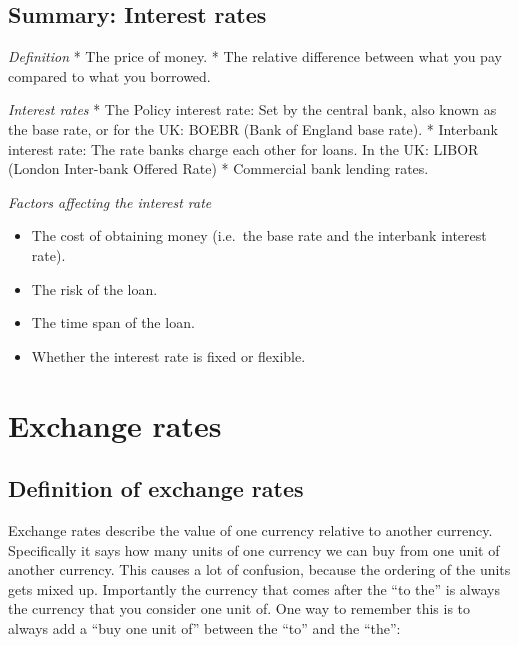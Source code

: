 \documentclass[
]{book}
\providecommand{\tightlist}{%
  \setlength{\itemsep}{0pt}\setlength{\parskip}{0pt}}
\begin{document}
\hypertarget{summary-interest-rates}{%
\subsection{Summary: Interest rates}\label{summary-interest-rates}}

\emph{Definition}
* The price of money.
* The relative difference between what you pay compared to what you borrowed.

\emph{Interest rates}
* The Policy interest rate: Set by the central bank, also known as the base rate, or for the UK: BOEBR (Bank of England base rate).
* Interbank interest rate: The rate banks charge each other for loans. In the UK: LIBOR (London Inter-bank Offered Rate)
* Commercial bank lending rates.

\emph{Factors affecting the interest rate}

\begin{itemize}
\tightlist
\item
  The cost of obtaining money (i.e.~the base rate and the interbank interest rate).
\item
  The risk of the loan.
\item
  The time span of the loan.
\item
  Whether the interest rate is fixed or flexible.
\end{itemize}

\hypertarget{exchange-rates}{%
\section{Exchange rates}\label{exchange-rates}}

\hypertarget{definition-of-exchange-rates}{%
\subsection*{Definition of exchange rates}\label{definition-of-exchange-rates}}

Exchange rates describe the value of one currency relative to another currency. Specifically it says how many units of one currency we can buy from one unit of another currency. This causes a lot of confusion, because the ordering of the units gets mixed up. Importantly the currency that comes after the ``to the'' is always the currency that you consider one unit of. One way to remember this is to always add a ``buy one unit of'' between the ``to'' and the ``the'':
\end{document}
